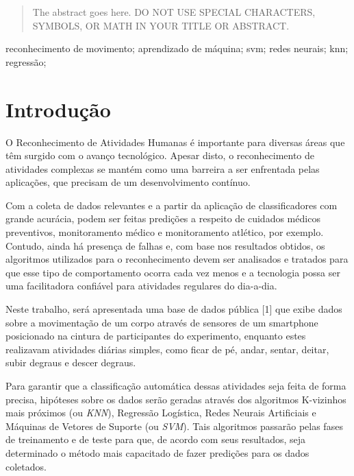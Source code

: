 \documentclass[10pt, conference, compsocconf]{IEEEtran}
\begin{document}
\begin{abstract}
The abstract goes here. DO NOT USE SPECIAL CHARACTERS, SYMBOLS, OR MATH IN YOUR TITLE OR ABSTRACT.

\end{abstract}

\begin{IEEEkeywords}
 reconhecimento de movimento; aprendizado de máquina; svm; redes neurais; knn;
regressão;
\end{IEEEkeywords}


%
\IEEEpeerreviewmaketitle



\section{Introdução}
\cite{IEEexample:IEEwebsite}
O Reconhecimento de Atividades Humanas é importante para diversas áreas que têm surgido com o avanço tecnológico. Apesar disto, o reconhecimento de atividades complexas se mantém como uma barreira a ser enfrentada pelas aplicações, que precisam de um desenvolvimento contínuo.

Com a coleta de dados relevantes e a partir da aplicação de classificadores com
grande acurácia, podem ser feitas predições a respeito de cuidados médicos
preventivos, monitoramento médico e monitoramento atlético, por exemplo. Contudo, 
ainda há presença de falhas e, com base nos resultados obtidos, os algoritmos
utilizados para o reconhecimento devem ser analisados e tratados para que esse
tipo de comportamento ocorra cada vez menos e a tecnologia possa ser uma 
facilitadora confiável para atividades regulares do dia-a-dia.

Neste trabalho, será apresentada uma base de dados pública [1] que exibe dados 
sobre a movimentação de um corpo através de sensores de um smartphone posicionado 
na cintura de participantes do experimento, enquanto estes realizavam atividades 
diárias simples, como ficar de pé, andar, sentar, deitar, subir degraus e 
descer degraus. 

Para garantir que a classificação automática dessas atividades seja feita de
forma precisa, hipóteses sobre os dados serão geradas através dos algoritmos
K-vizinhos mais próximos (ou \textsl{KNN}), Regressão Logística, Redes Neurais 
Artificiais e Máquinas de Vetores de Suporte (ou \textsl{SVM}). Tais algoritmos 
passarão pelas fases de treinamento e de teste para que, de acordo com seus
resultados, seja determinado o método mais capacitado de fazer predições para 
os dados coletados.
\end{document}
